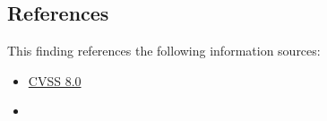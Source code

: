 
\subsection*{References}

This finding references the following information sources:

\begin{itemize}
	\item \href{https://www.first.org/cvss/calculator/3.0#CVSS:3.0/AV:A/AC:L/PR:L/UI:N/S:U/C:H/I:H/A:H}
	{CVSS 8.0}
	\item {}
\end{itemize}


